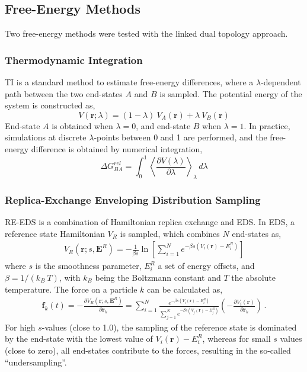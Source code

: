 \FloatBarrier

\subsection{Free-Energy Methods}
Two free-energy methods were tested with the linked dual topology approach.

\subsubsection{Thermodynamic Integration}
TI is a standard method to estimate free-energy differences,\cite{Kirkwood1935} where a $\lambda$-dependent path between the two end-states $A$ and $B$ is sampled. The potential energy of the system is constructed as,
\begin{equation}
    V(\textbf{r}; \lambda) = (1-\lambda) ~ V_A(\textbf{r}) + \lambda ~ V_B(\textbf{r})
    \label{eq: TI-Potential}
\end{equation}
End-state $A$ is obtained when $\lambda = 0$, and end-state $B$ when $\lambda = 1$. In practice, simulations at discrete $\lambda$-points between 0 and 1 are performed, and the free-energy difference is obtained by numerical integration,
\begin{equation}
    \Delta G^{rel}_{BA} = \int^{1}_{0} \left< \frac{\partial V(\lambda)}{\partial \lambda} \right>_{\lambda} \,d\lambda
    \label{eq: TI-Integration}
\end{equation}

\subsubsection{Replica-Exchange Enveloping Distribution Sampling}
RE-EDS\cite{Sidler2016,Sidler2017,Ries2021B} is a combination of Hamiltonian replica exchange\cite{Hansmann1997,Sugita2000} and EDS.\cite{Christ2007,Christ2008} In EDS, a reference state Hamiltonian $V_R$ is sampled, which combines $N$ end-states as,
\begin{align}
    V_R\left(\textbf{r};s,\textbf{E}^R\right) = -\frac{1}{\beta s}\ln\left[\sum\limits_{i=1}^N e^{-\beta s\left(V_i(\textbf{r})-E_i^R\right)}\right]
\end{align}
where $s$ is the smoothness parameter, $E_i^R$ a set of energy offsets, and $\beta=1/(k_B~T)$, with $k_B$ being the Boltzmann constant and $T$ the absolute temperature. 
The force on a particle $k$ can be calculated as, \cite{Christ2007,Christ2008}
\begin{align}
    \textbf{f}_k(t)=-\frac{\partial V_R(\textbf{r}; s, \textbf{E}^R)}{\partial \textbf{r}_k} = \sum^N_{i=1}\frac{e^{-\beta s(V_i(\textbf{r}) -E_i^R)}}{\sum^N_{j=1}{e^{-\beta s (V_j(\textbf{r})-E_j^R)}}}  \left( -\frac{\partial V_i(\textbf{r})}{\partial \textbf{r}_k} \right) \,.
\end{align}
For high $s$-values (close to 1.0), the sampling of the reference state is dominated by the end-state with the lowest value of $V_i(\textbf{r}) - E_i^R$, whereas for small $s$ values (close to zero), all end-states contribute to the forces, resulting in the so-called ``undersampling''.\cite{Riniker2011} 

